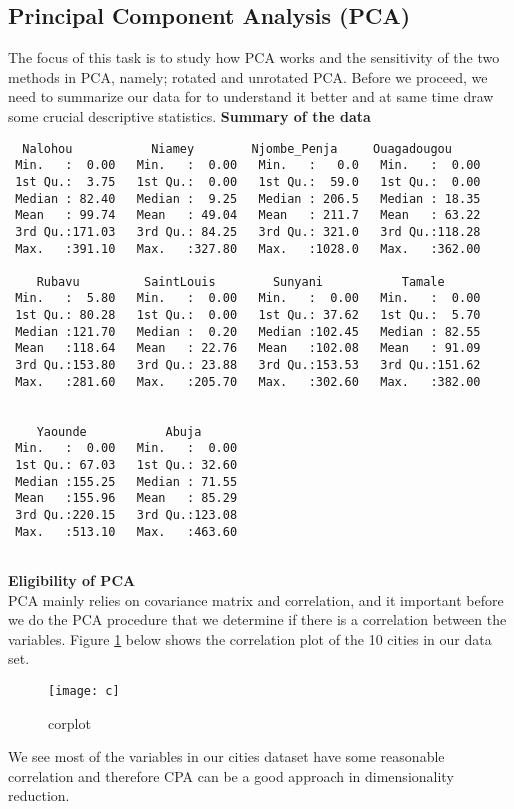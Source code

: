 \documentclass[12pt,a4paper]{article}
\begin{document}
\subsection{Principal Component Analysis (PCA)}
The focus of this task is to study how PCA works and the sensitivity of the two methods in PCA, namely; rotated and unrotated PCA.
Before we proceed, we need to summarize our data for to understand it better and at same time draw some crucial descriptive statistics.
\newpage
\textbf{Summary of the data}
\begin{verbatim}
  Nalohou           Niamey        Njombe_Penja     Ouagadougou    
 Min.   :  0.00   Min.   :  0.00   Min.   :   0.0   Min.   :  0.00  
 1st Qu.:  3.75   1st Qu.:  0.00   1st Qu.:  59.0   1st Qu.:  0.00  
 Median : 82.40   Median :  9.25   Median : 206.5   Median : 18.35  
 Mean   : 99.74   Mean   : 49.04   Mean   : 211.7   Mean   : 63.22  
 3rd Qu.:171.03   3rd Qu.: 84.25   3rd Qu.: 321.0   3rd Qu.:118.28  
 Max.   :391.10   Max.   :327.80   Max.   :1028.0   Max.   :362.00
 
    Rubavu         SaintLouis        Sunyani           Tamale      
 Min.   :  5.80   Min.   :  0.00   Min.   :  0.00   Min.   :  0.00  
 1st Qu.: 80.28   1st Qu.:  0.00   1st Qu.: 37.62   1st Qu.:  5.70  
 Median :121.70   Median :  0.20   Median :102.45   Median : 82.55  
 Mean   :118.64   Mean   : 22.76   Mean   :102.08   Mean   : 91.09  
 3rd Qu.:153.80   3rd Qu.: 23.88   3rd Qu.:153.53   3rd Qu.:151.62  
 Max.   :281.60   Max.   :205.70   Max.   :302.60   Max.   :382.00
 
 
    Yaounde           Abuja       
 Min.   :  0.00   Min.   :  0.00  
 1st Qu.: 67.03   1st Qu.: 32.60  
 Median :155.25   Median : 71.55  
 Mean   :155.96   Mean   : 85.29  
 3rd Qu.:220.15   3rd Qu.:123.08  
 Max.   :513.10   Max.   :463.60  
 
\end{verbatim}
\textbf{Eligibility of PCA}\\
PCA mainly relies on covariance matrix and correlation, and it important before we do the PCA procedure that we determine if there is a correlation between the variables. Figure \ref{4} below shows the correlation plot of the 10 cities in our data set.
\begin{figure}[H]
\texttt{[image: c]}
\centering
\caption{corplot}
\label{4}
\end{figure}
We see most of the variables in our cities dataset have some reasonable correlation and therefore CPA can be a good approach in dimensionality reduction.
\end{document}
